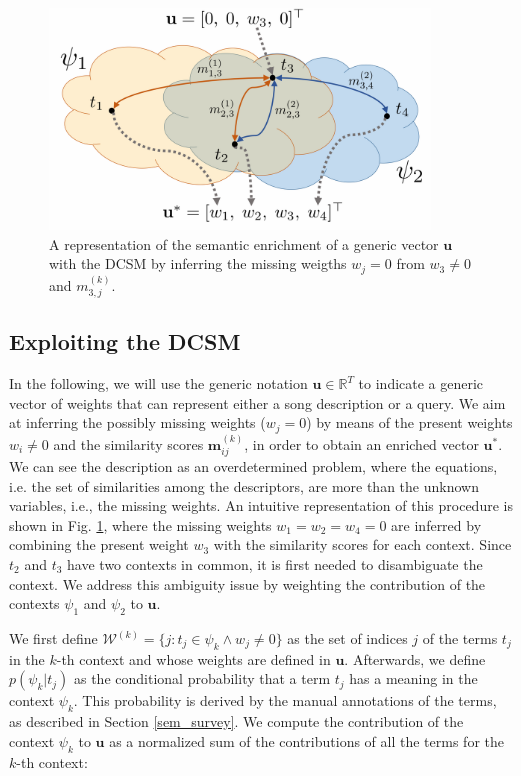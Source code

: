 \begin{figure}[tbp]
        \centering
         \includegraphics[width=0.9\textwidth]{img/DCSM/DCSM2}
        \caption{A representation of the semantic enrichment of a generic vector $\mathbf{u}$ with the DCSM by inferring the missing weigths $w_j=0$ from $ w_{3} \neq 0 $ and $m_{3,j}^{(k)}$. %
        }
    \label{fig:DCSMexpand}
\end{figure}

\subsection{Exploiting the DCSM}
\label{subsec:DCSMenrichment}
In the following, we will use the generic notation $\mathbf{u} \in \mathbb{R}^T$ to indicate a generic vector of weights that can represent either a song description or a query. We aim at inferring the possibly missing weights ($w_j = 0$) by means of the present weights $w_i \neq0$ and the similarity scores $\mathbf{m}_{ij}^{(k)}$, in order to obtain an enriched vector $\mathbf{u}^*$. We can see the description as an overdetermined problem, where the equations, i.e. the set of similarities among the descriptors, are more than the unknown variables, i.e., the missing weights. An intuitive representation of this procedure is shown in Fig. \ref{fig:DCSMexpand}, where the missing weights $w_1=w_2=w_4=0$ are inferred by combining the present weight $w_3$ with the similarity scores for each context. Since $t_2$ and $t_3$ have two contexts in common, it is first needed to disambiguate the context. We address this ambiguity issue by weighting the contribution of the contexts $\psi_1$ and $\psi_2$ to $\mathbf{u}$.

We first define $\mathcal{W}^{(k)}=\{j: t_j \in \psi_k \land w_j \neq 0\}$ as the set of indices $j$ of the terms $t_j$ in the $k$-th context and whose weights are defined in $\mathbf{u}$. Afterwards, we define $ p(\psi_k | t_j) $ as the conditional probability that a term $t_j$ has a meaning in the context $\psi_k$. This probability is derived by the manual annotations of the terms, as described in Section \ref{sem_survey}. We compute the contribution of the context $\psi_k$ to $\mathbf{u}$ as a normalized sum of the contributions of all the terms for the $k$-th context:

